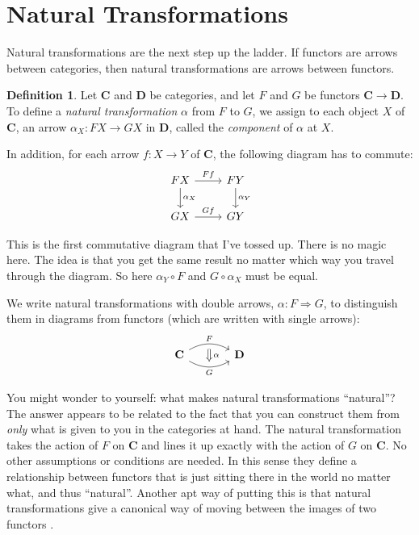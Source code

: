 \documentclass[12pt]{article}
\theoremstyle{definition}
\theoremstyle{definition}
\newtheorem{defn}{Definition}[]
\theoremstyle{definition}
\numberwithin{equation}{section}
\newcommand{\cat}[1]{\mathbf{#1}}      %
\newcommand{\CC}{\cat{C}}
\newcommand{\DD}{\cat{D}}
\newcommand{\fto}{\Rightarrow}
\def\ni{\goodbreak\noindent}
\begin{document}
\section{Natural Transformations}

Natural transformations are the next step up the ladder. If functors are arrows between
categories, then natural transformations are arrows between functors.
\begin{defn}
Let $\CC$ and $\DD$ be categories, and let $F$ and $G$ be functors $\CC \to \DD$. To
define a \emph{natural transformation} $\alpha$ from $F$ to $G$, we assign to each object
$X$ of $\CC$, an arrow $\alpha_X:FX\to GX$ in $\DD$, called the \emph{component} of
$\alpha$ at $X$. 

In addition, for each arrow $f:X\to Y$ of $\CC$, the following diagram
has to commute:
  $$
  \begin{tikzcd}
   FX \ar{r}{Ff} \ar{d}{\alpha_X} & FY \ar{d}{\alpha_{Y}} \\
   GX \ar{r}{Gf} & GY
  \end{tikzcd}
  $$
\end{defn}
\ni
This is the first commutative diagram that I've tossed up. There is no magic here. The
idea is that you get the same result no matter which way you travel through the diagram.
So here $\alpha_Y \circ F$ and $G \circ \alpha_X$ must be equal.

We write natural transformations with double arrows, $\alpha: F \fto G$, to distinguish
them in diagrams from functors (which are written with single arrows):
 $$
 \begin{tikzcd}[column sep=large]
  \CC \ar[bend left,""{below,name=F}]{r}{F} \ar[bend right,""{above,name=G}]{r}[swap]{G} & \DD
  \ar[Rightarrow,from=F,to=G,"\,\alpha"]
 \end{tikzcd}
 $$

You might wonder to yourself: what makes natural transformations ``natural''? The answer
appears to be related to the fact that you can construct them from {\it only} what is
given to you in the categories at hand. The natural transformation takes the action of $F$
on $\CC$ and lines it up exactly with the action of $G$ on $\CC$. No other assumptions or
conditions are needed. In this sense they define a relationship between functors that is
just sitting there in the world no matter what, and thus ``natural''. Another apt way of
putting this is that natural transformations give a canonical way of moving between the
images of two functors \cite{Goedecke}.
\end{document}
